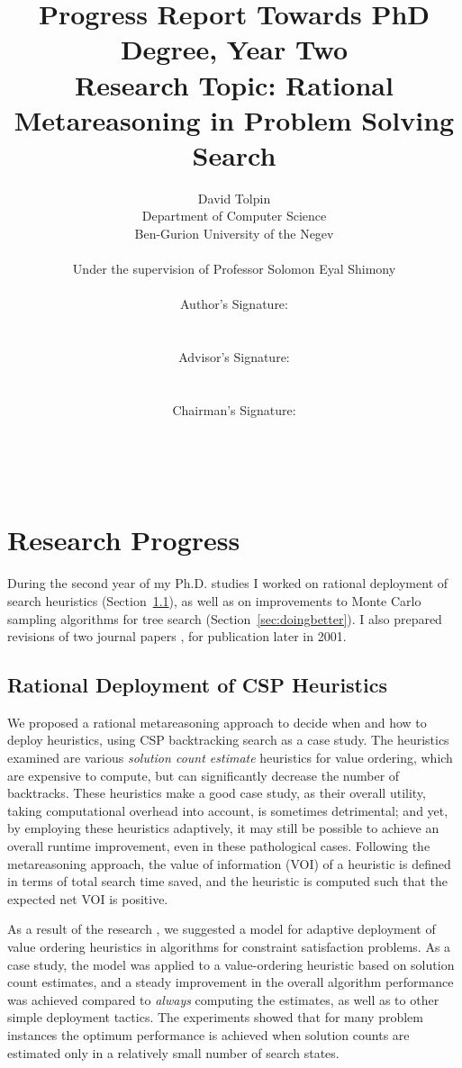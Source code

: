 \documentclass[]{article}
\title{Progress Report Towards PhD Degree, Year Two\\
  Research Topic: Rational Metareasoning in Problem Solving Search}
\author{David Tolpin\\
        Department of Computer Science\\
        Ben-Gurion University of the Negev\\
        \\
        Under the supervision of Professor Solomon Eyal Shimony\\
        \\
        Author's Signature: \rule{10em}{1pt}\\
        Advisor's Signature: \rule{10em}{1pt}\\
        Chairman's Signature: \rule{10em}{1pt}\\
      \\}
\begin{document}
\maketitle

\section{Research Progress}

During the second year of my Ph.D. studies I worked on rational
deployment of search heuristics (Section~\ref{sec:raticsp}), as well
as on improvements to Monte Carlo sampling algorithms for tree search
(Section~\ref{sec:doingbetter}). I also prepared revisions of two
journal papers  \cite{TolpinShimony.semimyopic},
\cite{TolpinShimony.raticomp} for publication later in 2001.

\subsection{Rational Deployment of CSP Heuristics}
\label{sec:raticsp}

We proposed a rational metareasoning approach to decide when and how to
deploy heuristics, using CSP backtracking search as a case study.  The
heuristics examined are various {\em solution count estimate}
heuristics for value ordering, which are expensive to compute, but can
significantly decrease the number of backtracks. These heuristics make
a good case study, as their overall utility, taking computational
overhead into account, is sometimes detrimental; and yet, by employing
these heuristics adaptively, it may still be possible to achieve an
overall runtime improvement, even in these pathological cases.
Following the metareasoning approach, the value of information (VOI)
of a heuristic is defined in terms of total search time saved, and the
heuristic is computed such that the expected net VOI is positive.

As a result of the research \cite{TolpinShimony.raticsp}, we suggested
a model for adaptive deployment of value ordering heuristics in
algorithms for constraint satisfaction problems. As a case study, the
model was applied to a value-ordering heuristic based on solution
count estimates, and a steady improvement in the overall algorithm
performance was achieved compared to {\em always} computing the
estimates, as well as to other simple deployment tactics.  The
experiments showed that for many problem instances the optimum
performance is achieved when solution counts are estimated only in a
relatively small number of search states.
\end{document}
